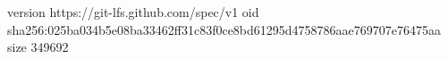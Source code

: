version https://git-lfs.github.com/spec/v1
oid sha256:025ba034b5e08ba33462ff31c83f0ce8bd61295d4758786aae769707e76475aa
size 349692
